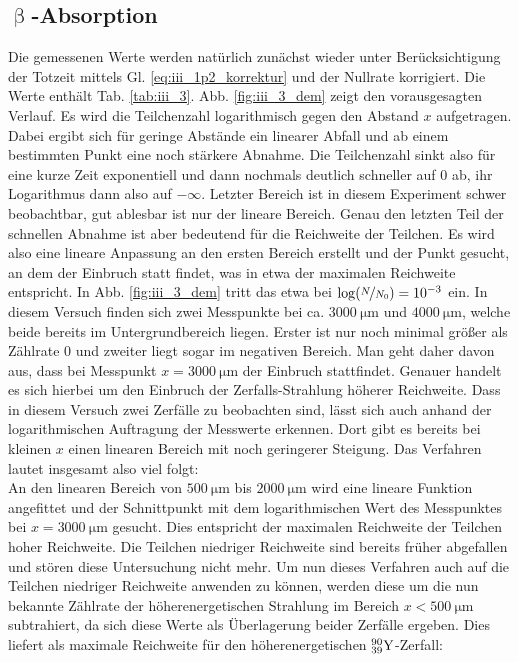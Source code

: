 \subsection{\texorpdfstring{$\upbeta$}{Beta}-Absorption}
Die gemessenen Werte werden natürlich zunächst wieder unter Berücksichtigung der Totzeit mittels Gl. \eqref{eq:iii_1p2_korrektur} und der Nullrate korrigiert. Die Werte enthält Tab. \ref{tab:iii_3}. Abb. \ref{fig:iii_3_dem} zeigt den vorausgesagten Verlauf. Es wird die Teilchenzahl logarithmisch gegen den Abstand $x$ aufgetragen. Dabei ergibt sich für geringe Abstände ein linearer Abfall und ab einem bestimmten Punkt eine noch stärkere Abnahme. Die Teilchenzahl sinkt also für eine kurze Zeit exponentiell und dann nochmals deutlich schneller auf 0 ab, ihr Logarithmus dann also auf $-\infty$. Letzter Bereich ist in diesem Experiment schwer beobachtbar, gut ablesbar ist nur der lineare Bereich. Genau den letzten Teil der schnellen Abnahme ist aber bedeutend für die Reichweite der Teilchen. Es wird also eine lineare Anpassung an den ersten Bereich erstellt und der Punkt gesucht, an dem der Einbruch statt findet, was in etwa der maximalen Reichweite entspricht. In Abb. \ref{fig:iii_3_dem} tritt das etwa bei $\log(\nicefrac{N}{N_0}) = 10^{-3}$ ein. In diesem Versuch finden sich zwei Messpunkte bei ca. $\SI{3000}{\micro\meter}$ und $\SI{4000}{\micro\meter}$, welche beide bereits im Untergrundbereich liegen. Erster ist nur noch minimal größer als Zählrate 0 und zweiter liegt sogar im negativen Bereich. Man geht daher davon aus, dass bei Messpunkt $x=\SI{3000}{\micro\meter}$ der Einbruch stattfindet. Genauer handelt es sich hierbei um den Einbruch der Zerfalls-Strahlung höherer Reichweite. Dass in diesem Versuch zwei Zerfälle zu beobachten sind, lässt sich auch anhand der logarithmischen Auftragung der Messwerte erkennen. Dort gibt es bereits bei kleinen $x$ einen linearen Bereich mit noch geringerer Steigung. Das Verfahren lautet insgesamt also viel folgt:\\
An den linearen Bereich von $\SI{500}{\micro\meter}$ bis $\SI{2000}{\micro\meter}$ wird eine lineare Funktion angefittet und der Schnittpunkt mit dem logarithmischen Wert des Messpunktes bei $x=\SI{3000}{\micro\meter}$ gesucht. Dies entspricht der maximalen Reichweite der Teilchen hoher Reichweite. Die Teilchen niedriger Reichweite sind bereits früher abgefallen und stören diese Untersuchung nicht mehr. Um nun dieses Verfahren auch auf die Teilchen niedriger Reichweite anwenden zu können, werden diese um die nun bekannte Zählrate der höherenergetischen Strahlung im Bereich $x < \SI{500}{\micro\meter}$ subtrahiert, da sich diese Werte als Überlagerung beider Zerfälle ergeben. Dies liefert als maximale Reichweite für den höherenergetischen $\element{Y}{39}{90}$-Zerfall:
